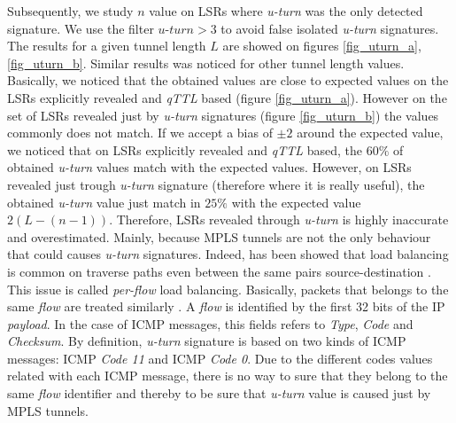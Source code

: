 Subsequently, we study $n$ value on LSRs where \textit{u-turn} was the only detected
signature. We use the filter $\textit{u-turn}>3$ to
avoid false isolated \textit{u-turn} signatures. The results for a given tunnel length $L$ are showed on figures
\ref{fig_uturn_a}, \ref{fig_uturn_b}. Similar results was noticed for other tunnel length values. Basically, we noticed that the obtained values are close to expected values on the LSRs explicitly revealed  and \textit{qTTL} based (figure \ref{fig_uturn_a}). However on the set of  LSRs revealed just by \textit{u-turn} signatures (figure \ref{fig_uturn_b}) the values commonly  does not match. If we accept a bias of $ \pm 2$ around the expected value, we
noticed that  on LSRs explicitly revealed  and \textit{qTTL} based, the $60\%$ of obtained \textit{u-turn} values match
with the expected values. However, on LSRs
revealed just trough \textit{u-turn} signature (therefore where it
is really useful), the obtained \textit{u-turn} value just match in $25\%$ with the expected value $2(L-(n-1))$. 
Therefore, LSRs revealed through \textit{u-turn} is highly inaccurate and overestimated. Mainly, because MPLS tunnels are not the
only behaviour that could causes \textit{u-turn} signatures. Indeed, has been showed that load balancing is common on traverse paths even between the same pairs source-destination \cite{BRICE07}. This issue is called \textit{per-flow} load balancing. Basically, packets that belongs to the same \textit{flow} are treated similarly \cite{BRICE06}. A \textit{flow} is identified by the first 32 bits of the IP \textit{payload}. In the case of ICMP messages, this fields refers to \textit{Type},
\textit{Code} and \textit{Checksum}. By definition, \textit{u-turn} signature is
based on two kinds of ICMP messages: ICMP \echoreply \textit{Code 11} and ICMP
\ttlexceeded \textit{Code 0}. Due to the different codes values
related with each ICMP message, there is no way to sure that they belong to the same \textit{flow} identifier and thereby to be sure that \textit{u-turn} value is caused just by MPLS tunnels.
